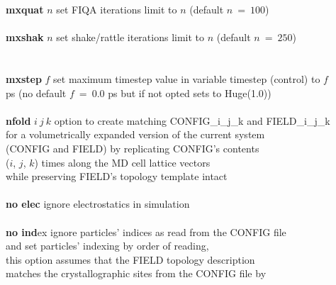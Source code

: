 \begin{tabbing}
\> {\bf mxquat} $n$                             \> set FIQA iterations limit to $n$ (default $n~=~100$) \\
\>                                              \> \\
\> {\bf mxshak} $n$                             \> set shake/rattle iterations limit to $n$ (default $n~=~250$) \\
\>                                              \> \\
\>                                              \> \\
\> {\bf mxstep} $f$                             \> set maximum timestep value in variable timestep (control) to $f$ \\
\>                                              \> ps (no default $f~=~0.0$ ps but if not opted sets to Huge(1.0)) \\
\>                                              \> \\
\> {\bf nfold} $i~j~k$                          \> option to create matching CONFIG\_i\_j\_k and FIELD\_i\_j\_k \\
\>                                              \> for a volumetrically expanded version of the current system \\
\>                                              \> (CONFIG and FIELD) by replicating CONFIG's contents \\
\>                                              \> ($i$, $j$, $k$) times along the MD cell lattice vectors \\
\>                                              \> while preserving FIELD's topology template intact \\
\>                                              \> \\
\> {\bf no elec}                                \> ignore electrostatics in simulation \\
\>                                              \> \\
\> {\bf no ind}ex                               \> ignore particles' indices as read from the CONFIG file \\
\>                                              \> and set particles' indexing by order of reading, \\
\>                                              \> this option assumes that the FIELD topology description \\
\>                                              \> matches the crystallographic sites from the CONFIG file by \\

\end{tabbing}
